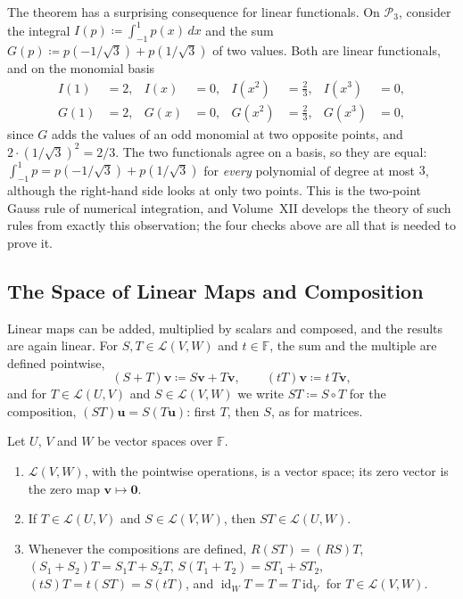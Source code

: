 The theorem has a surprising consequence for linear functionals. On $\mathcal P_3$, consider the integral $I(p)\coloneqq\int_{-1}^1p(x)\,dx$ and the sum $G(p)\coloneqq p(-1/\sqrt3)+p(1/\sqrt3)$ of two values. Both are linear functionals, and on the monomial basis
\[
\begin{aligned}
I(1)&=2,&I(x)&=0,&I(x^2)&=\tfrac23,&I(x^3)&=0,\\
G(1)&=2,&G(x)&=0,&G(x^2)&=\tfrac23,&G(x^3)&=0,
\end{aligned}
\]
since $G$ adds the values of an odd monomial at two opposite points, and $2\cdot(1/\sqrt3)^2=2/3$. The two functionals agree on a basis, so they are equal: $\int_{-1}^1p=p(-1/\sqrt3)+p(1/\sqrt3)$ for \emph{every} polynomial of degree at most $3$, although the right-hand side looks at only two points. This is the two-point Gauss rule of numerical integration, and Volume~XII develops the theory of such rules from exactly this observation; the four checks above are all that is needed to prove it.

\subsection{The Space of Linear Maps and Composition}

Linear maps can be added, multiplied by scalars and composed, and the results are again linear. For $S,T\in\mathcal L(V,W)$ and $t\in\mathbb F$, the sum and the multiple are defined pointwise,
\[
(S+T)\mathbf v\coloneqq S\mathbf v+T\mathbf v,\qquad(tT)\mathbf v\coloneqq t\,T\mathbf v,
\]
and for $T\in\mathcal L(U,V)$ and $S\in\mathcal L(V,W)$ we write $ST\coloneqq S\circ T$ for the composition, $(ST)\mathbf u=S(T\mathbf u)$: first $T$, then $S$, as for matrices.

\begin{proposition}
\label{prop:linear-map-space}
Let $U$, $V$ and $W$ be vector spaces over $\mathbb F$.
\begin{enumerate}
\item $\mathcal L(V,W)$, with the pointwise operations, is a vector space; its zero vector is the zero map $\mathbf v\mapsto\mathbf 0$.
\item If $T\in\mathcal L(U,V)$ and $S\in\mathcal L(V,W)$, then $ST\in\mathcal L(U,W)$.
\item Whenever the compositions are defined, $R(ST)=(RS)T$, $(S_1+S_2)T=S_1T+S_2T$, $S(T_1+T_2)=ST_1+ST_2$, $(tS)T=t(ST)=S(tT)$, and $\operatorname{id}_WT=T=T\operatorname{id}_V$ for $T\in\mathcal L(V,W)$.
\end{enumerate}
\end{proposition}

